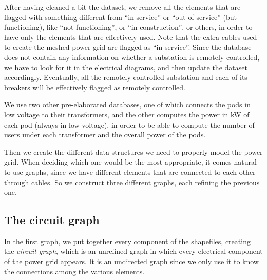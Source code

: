 After having cleaned a bit the dataset, we remove all the elements that are flagged with something different from ``in service'' or ``out of service'' (but functioning), like ``not functioning'', or ``in construction'', or others, in order to have only the elements that are effectively used. Note that the extra cables used to create the meshed power grid are flagged as ``in service''. Since the database does not contain any information on whether a substation is remotely controlled, we have to look for it in the electrical diagrams, and then update the dataset accordingly. Eventually, all the remotely controlled substation and each of its breakers will be effectively flagged as remotely controlled.

We use two other pre-elaborated databases, one of which connects the pods in low voltage to their transformers, and the other computes the power in kW of each pod (always in low voltage), in order to be able to compute the number of users under each transformer and the overall power of the pods.

Then we create the different data structures we need to properly model the power grid. When deciding which one would be the most appropriate, it comes natural to use graphs, since we have different elements that are connected to each other through cables. So we construct three different graphs, each refining the previous one.



\subsection{The circuit graph}

In the first graph, we put together every component of the shapefiles, creating the \emph{circuit graph}, which is an unrefined graph in which every electrical component of the power grid appears. It is an undirected graph since we only use it to know the connections among the various elements.

